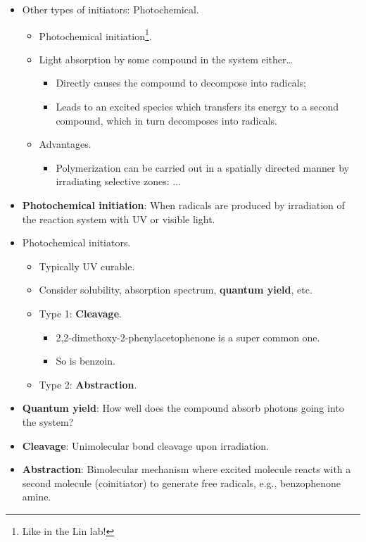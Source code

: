 \documentclass[../notes.tex]{subfiles}
\begin{document}
\begin{itemize}
    \item Other types of initiators: Photochemical.
    \begin{itemize}
        \item Photochemical initiation\footnote{Like in the Lin lab!}.
        \item Light absorption by some compound in the system either\dots
        \begin{itemize}
            \item Directly causes the compound to decompose into radicals;
            \item Leads to an excited species which transfers its energy to a second compound, which in turn decomposes into radicals.
        \end{itemize}
        \item Advantages.
        \begin{itemize}
            \item Polymerization can be carried out in a spatially directed manner by irradiating selective zones: ...
        \end{itemize}
    \end{itemize}
    \item \textbf{Photochemical initiation}: When radicals are produced by irradiation of the reaction system with UV or visible light.
    \item Photochemical initiators.
    \begin{itemize}
        \item Typically UV curable.
        \item Consider solubility, absorption spectrum, \textbf{quantum yield}, etc.
        \item Type 1: \textbf{Cleavage}.
        \begin{itemize}
            \item 2,2-dimethoxy-2-phenylacetophenone is a super common one.
            \item So is benzoin.
        \end{itemize}
        \item Type 2: \textbf{Abstraction}.
    \end{itemize}
    \item \textbf{Quantum yield}: How well does the compound absorb photons going into the system?
    \item \textbf{Cleavage}: Unimolecular bond cleavage upon irradiation.
    \item \textbf{Abstraction}: Bimolecular mechanism where excited molecule reacts with a second molecule (coinitiator) to generate free radicals, e.g., benzophenone amine.

\end{itemize}
\end{document}
